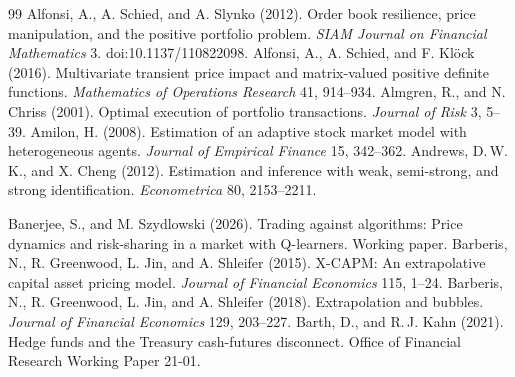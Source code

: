 \documentclass[12pt]{article}
\theoremstyle{definition}
\theoremstyle{remark}
\begin{document}
\begin{thebibliography}{99}\setlength{\itemsep}{2pt}\small
{} Alfonsi, A., A. Schied, and A. Slynko (2012). Order book resilience, price manipulation, and the positive portfolio problem. \emph{SIAM Journal on Financial Mathematics} 3. doi:10.1137/110822098.
 Alfonsi, A., A. Schied, and F. Kl\"ock (2016). Multivariate transient price impact and matrix-valued positive definite functions. \emph{Mathematics of Operations Research} 41, 914--934.
 Almgren, R., and N. Chriss (2001). Optimal execution of portfolio transactions. \emph{Journal of Risk} 3, 5--39.
 Amilon, H. (2008). Estimation of an adaptive stock market model with heterogeneous agents. \emph{Journal of Empirical Finance} 15, 342--362.
 Andrews, D.\,W.\,K., and X. Cheng (2012). Estimation and inference with weak, semi-strong, and strong identification. \emph{Econometrica} 80, 2153--2211.

 Banerjee, S., and M. Szydlowski (2026). Trading against algorithms: Price dynamics and risk-sharing in a market with Q-learners. Working paper.
 Barberis, N., R. Greenwood, L. Jin, and A. Shleifer (2015). X-CAPM: An extrapolative capital asset pricing model. \emph{Journal of Financial Economics} 115, 1--24.
 Barberis, N., R. Greenwood, L. Jin, and A. Shleifer (2018). Extrapolation and bubbles. \emph{Journal of Financial Economics} 129, 203--227.
 Barth, D., and R.\,J. Kahn (2021). Hedge funds and the Treasury cash-futures disconnect. Office of Financial Research Working Paper 21-01.


\end{thebibliography}
\end{document}
